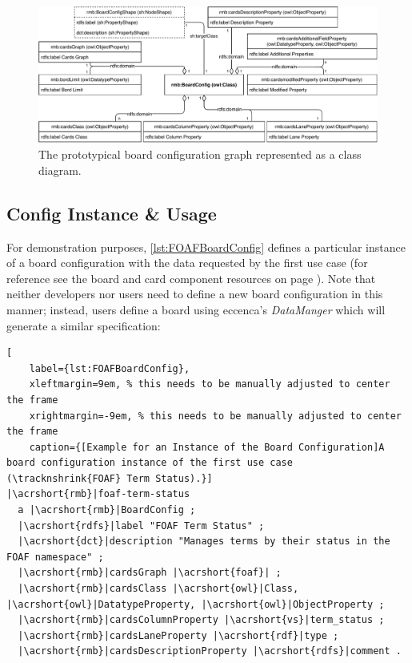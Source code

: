 \begin{figure}[H]
\centering
\includegraphics[width=\linewidth]{img/BoardConfigUML.pdf}
	\caption[Board Configuration Graph as  Class Diagram]{The prototypical board configuration graph represented as a  class diagram.}
	\label{fig:BoardConfigUML}
\end{figure}


\subsection{Config Instance \& Usage}


\noindent For demonstration purposes, \autoref{lst:FOAFBoardConfig} defines a particular instance of a board configuration with the data requested by the first use case (for reference see the board and card component resources on page \pageref{par:FOAF-BCR}). Note that neither developers nor users need to define a new board configuration in this manner; instead, users define a board using eccenca’s \textit{DataManger} which will generate a similar specification:

\begin{spacing}{0.9}
    \lstset{language=N3,escapechar=|}
    \begin{lstlisting}[
    label={lst:FOAFBoardConfig},
    xleftmargin=9em, % this needs to be manually adjusted to center the frame
    xrightmargin=-9em, % this needs to be manually adjusted to center the frame
    caption={[Example for an Instance of the Board Configuration]A board configuration instance of the first use case (\tracknshrink{FOAF} Term Status).}]
|\acrshort{rmb}|foaf-term-status
  a |\acrshort{rmb}|BoardConfig ;
  |\acrshort{rdfs}|label "FOAF Term Status" ;
  |\acrshort{dct}|description "Manages terms by their status in the FOAF namespace" ;
  |\acrshort{rmb}|cardsGraph |\acrshort{foaf}| ;
  |\acrshort{rmb}|cardsClass |\acrshort{owl}|Class, |\acrshort{owl}|DatatypeProperty, |\acrshort{owl}|ObjectProperty ;
  |\acrshort{rmb}|cardsColumnProperty |\acrshort{vs}|term_status ;
  |\acrshort{rmb}|cardsLaneProperty |\acrshort{rdf}|type ;
  |\acrshort{rmb}|cardsDescriptionProperty |\acrshort{rdfs}|comment .
\end{lstlisting}
\end{spacing}


